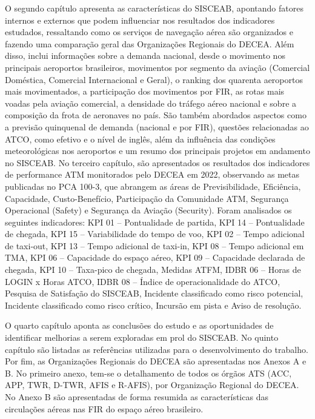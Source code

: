 \documentclass[
]{book}
\begin{document}
O segundo capítulo apresenta as características do SISCEAB, apontando fatores internos e externos que podem influenciar nos resultados dos indicadores estudados, ressaltando como os serviços de navegação aérea são organizados e fazendo uma comparação geral das Organizações Regionais do DECEA. Além disso, inclui informações sobre a demanda nacional, desde o movimento nos principais aeroportos brasileiros, movimentos por segmento da aviação (Comercial Doméstica, Comercial Internacional e Geral), o ranking dos quarenta aeroportos mais movimentados, a participação dos movimentos por FIR, as rotas mais voadas pela aviação comercial, a densidade do tráfego aéreo nacional e sobre a composição da frota de aeronaves no país. São também abordados aspectos como a previsão quinquenal de demanda (nacional e por FIR), questões relacionadas ao ATCO, como efetivo e o nível de inglês, além da influência das condições meteorológicas nos aeroportos e um resumo dos principais projetos em andamento no SISCEAB.
No terceiro capítulo, são apresentados os resultados dos indicadores de performance ATM monitorados pelo DECEA em 2022, observando as metas publicadas no PCA 100-3, que abrangem as áreas de Previsibilidade, Eficiência, Capacidade, Custo-Benefício, Participação da Comunidade ATM, Segurança Operacional (Safety) e Segurança da Aviação (Security). Foram analisados os seguintes indicadores: KPI 01 -- Pontualidade de partida, KPI 14 -- Pontualidade de chegada, KPI 15 -- Variabilidade do tempo de voo, KPI 02 -- Tempo adicional de taxi-out, KPI 13 -- Tempo adicional de taxi-in, KPI 08 -- Tempo adicional em TMA, KPI 06 -- Capacidade do espaço aéreo, KPI 09 -- Capacidade declarada de chegada, KPI 10 -- Taxa-pico de chegada, Medidas ATFM, IDBR 06 -- Horas de LOGIN x Horas ATCO, IDBR 08 -- Índice de operacionalidade do ATCO, Pesquisa de Satisfação do SISCEAB, Incidente classificado como risco potencial, Incidente classificado como risco crítico, Incursão em pista e Aviso de resolução.

O quarto capítulo aponta as conclusões do estudo e as oportunidades de identificar melhorias a serem exploradas em prol do SISCEAB. No quinto capítulo são listadas as referências utilizadas para o desenvolvimento do trabalho.
Por fim, as Organizações Regionais do DECEA são apresentadas nos Anexos A e B. No primeiro anexo, tem-se o detalhamento de todos os órgãos ATS (ACC, APP, TWR, D-TWR, AFIS e R-AFIS), por Organização Regional do DECEA. No Anexo B são apresentadas de forma resumida as características das circulações aéreas nas FIR do espaço aéreo brasileiro.
\end{document}
